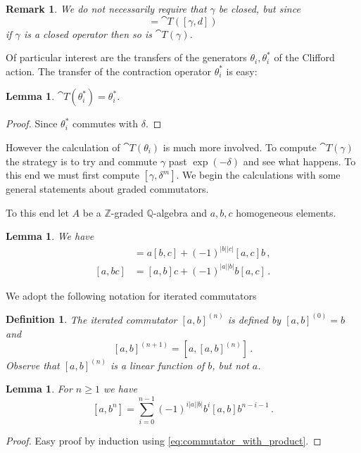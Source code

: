 \documentclass[english,letter paper,12pt,leqno]{article}
\newtheorem{lemma}[theorem]{Lemma}
\theoremstyle{example}
\newtheorem{definition}[theorem]{Definition}
\newtheorem{remark}[theorem]{Remark}
\numberwithin{equation}{section}
\def\be{\begin{equation}}
\def\ee{\end{equation}}
\def\nZ{\mathds{Z}}
\def\nQ{\mathds{Q}}
\begin{document}
\begin{remark} We do not necessarily require that $\gamma$ be closed, but since
\be
[\cat{T}(\gamma), d_K + d] = \cat{T}( [\gamma, d] )
\ee
if $\gamma$ is a closed operator then so is $\cat{T}(\gamma)$. 
\end{remark}

Of particular interest are the transfers of the generators $\theta_i, \theta_i^*$ of the Clifford action. The transfer of the contraction operator $\theta_i^*$ is easy:

\begin{lemma} $\cat{T}(\theta_i^*) = \theta_i^*$.
\end{lemma}
\begin{proof}
Since $\theta_i^*$ commutes with $\delta$.
\end{proof}

However the calculation of $\cat{T}(\theta_i)$ is much more involved. To compute $\cat{T}(\gamma)$ the strategy is to try and commute $\gamma$ past $\exp(-\delta)$ and see what happens. To this end we must first compute $[\gamma, \delta^m]$. We begin the calculations with some general statements about graded commutators. 

To this end let $A$ be a $\nZ$-graded $\nQ$-algebra and $a,b,c$ homogeneous elements.

\begin{lemma} We have
\begin{align}
[ab,c] &= a[b,c] + (-1)^{|b||c|} [a,c]b\,,\\
[a,bc] &= [a,b]c + (-1)^{|a||b|} b[a,c]\,. \label{eq:commutator_with_product}
\end{align}
\end{lemma}

We adopt the following notation for iterated commutators

\begin{definition} The iterated commutator $[a,b]^{(n)}$ is defined by $[a,b]^{(0)} = b$ and
\[
[a,b]^{(n+1)} = [a, [a,b]^{(n)}]\,.
\]
Observe that $[a,b]^{(n)}$ is a linear function of $b$, but not $a$.
\end{definition}

\begin{lemma}\label{lemma:woop3} For $n \ge 1$ we have
\[
[a,b^n] = \sum_{i=0}^{n-1} (-1)^{i|a||b|} b^i [a,b] b^{n-i-1}\,.
\]
\end{lemma}
\begin{proof}
Easy proof by induction using \eqref{eq:commutator_with_product}.
\end{proof}
\end{document}
